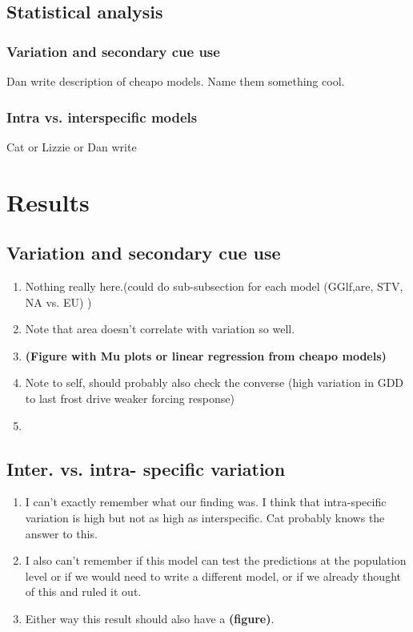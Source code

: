 \documentclass[11pt]{article}\usepackage[]{graphicx}\usepackage[]{color}
\begin{document}
\subsection*{Statistical analysis}
\subsubsection*{Variation and secondary cue use}
Dan write description of cheapo models. Name them something cool. 
\subsubsection*{Intra vs. interspecific models}
Cat or Lizzie or Dan write

\section*{Results}
\subsection*{Variation and secondary cue use}
\begin{enumerate}
\item Nothing really here.(could do sub-subsection for each model (GGlf,are, STV, NA vs. EU) )
\item Note that area doesn't correlate with variation so well.
\item \textbf{(Figure with Mu plots or linear regression from cheapo models)}
\item Note to self, should probably also check the converse (high variation in GDD to last frost drive weaker forcing response)
\item
\end{enumerate}
\subsection*{Inter. vs. intra- specific variation}
\begin{enumerate}
\item I can't exactly remember what our finding was. I think that intra-specific variation is high but not as high as interspecific. Cat probably knows the answer to this.
\item I also can't remember if this model can test the predictions at the population level or if we would need to write a different model, or if we already thought of this and ruled it out.
\item Either way this result should also have a \textbf{(figure)}.
\end{enumerate}
\end{document}
